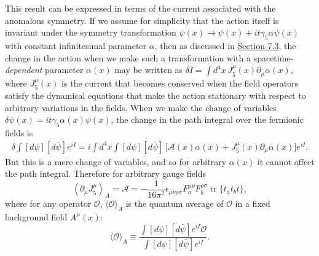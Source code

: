 This result can be expressed in terms of the current associated with the
anomalous symmetry. If we assume for simplicity that the action itself is
invariant under the symmetry transformation
$\psi(x)\to\psi(x)+it\gamma_5\alpha\psi(x)$ with constant infinitesimal
parameter $\alpha$, then as discussed in
\hyperref[sec:7.3]{Section 7.3}, the change in the action when we make such
a transformation with a spacetime-\emph{dependent} parameter $\alpha(x)$
may be written as
$\delta I=\int d^4x\,J_5^\mu(x)\partial_\mu\alpha(x)$, where $J_5^\mu(x)$
is the current that becomes conserved when the field operators satisfy the
dynamical equations that make the action stationary with respect to
arbitrary variations in the fields. When we make the change of variables
$\delta\psi(x)=it\gamma_5\alpha(x)\psi(x)$, the change in the path integral
over the fermionic fields is
\begin{equation}
 \begin{aligned}
 \delta\int[d\psi][d\bar\psi]e^{iI}
 =i\int d^4x\int[d\psi][d\bar\psi]\,
 \bigl[\mathcal A(x)\alpha(x)
 +J_5^\mu(x)\partial_\mu\alpha(x)\bigr]e^{iI}.
 \end{aligned}
 \tag{22.2.25}\label{eq:22.2.25}
\end{equation}
But this is a mere change of variables, and so for arbitrary $\alpha(x)$
it cannot affect the path integral. Therefore for arbitrary gauge fields
\begin{equation}
 \left\langle\partial_\mu J_5^\mu\right\rangle_A
 =\mathcal A
 =-\frac{1}{16\pi^2}\epsilon_{\mu\nu\rho\sigma}
 F_a^{\mu\nu}F_b^{\rho\sigma}
 \operatorname{tr}\{t_a t_b t\},
 \tag{22.2.26}\label{eq:22.2.26}
\end{equation}
where for any operator $\mathcal O$, $\langle\mathcal O\rangle_A$ is the
quantum average of $\mathcal O$ in a fixed background field $A^\mu(x)$:
\begin{equation}
 \langle\mathcal O\rangle_A\equiv
 \frac{\int[d\psi][d\bar\psi]e^{iI}\mathcal O}
 {\int[d\psi][d\bar\psi]e^{iI}}.
 \tag{22.2.27}\label{eq:22.2.27}
\end{equation}

